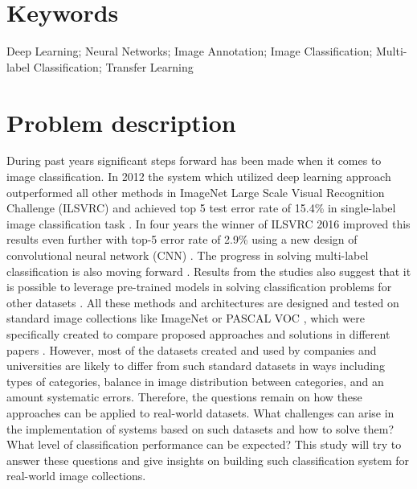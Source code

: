 \section{Keywords}
Deep Learning; Neural Networks; Image Annotation; Image Classification; Multi-label Classification; Transfer Learning

\section{Problem description}
During past years significant steps forward has been made when it comes to image classification. In 2012 the system which utilized deep learning approach outperformed all other methods in ImageNet Large Scale Visual Recognition Challenge (ILSVRC) and achieved top 5 test error rate of 15.4\% in single-label image classification task \cite{Krizhevsky2012ImageNetDNN, Russakovsky2015ImageNet, Schmidhuber2015DeepOverview}. In four years the winner of ILSVRC 2016 improved this results even further with top-5 error rate of 2.9\% using a new design of convolutional neural network (CNN) \cite{StanfordUniversity2016}. The progress in solving multi-label classification is also moving forward \cite{Ren2016, Wei2016HCP}. Results from the studies also suggest that it is possible to leverage pre-trained models in solving classification problems for other datasets \cite{Yosinski2014HowTransferable, Oquab2014TransferringMidLevel}. All these methods and architectures are designed and tested on standard image collections like ImageNet \cite{Russakovsky2015ImageNet} or PASCAL VOC \cite{Everingham2010PASCAL-VOC}, which were specifically created to compare proposed approaches and solutions in different papers \cite{Wei2016HCP, Gong2013DeepRanking, Oquab2014TransferringMidLevel, Chatfield2014ReturnDevilInTheDetails}. However, most of the datasets created and used by companies and universities are likely to differ from such standard datasets in ways including types of categories, balance in image distribution between categories, and an amount systematic errors. Therefore, the questions remain on how these approaches can be applied to real-world datasets. What challenges can arise in the implementation of systems based on such datasets and how to solve them? What level of classification performance can be expected? This study will try to answer these questions and give insights on building such classification system for real-world image collections.

